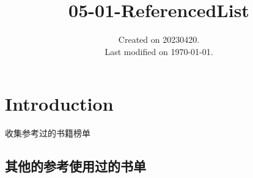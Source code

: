 \documentclass[UTF8]{../RepresentationUniverse}
\begin{document}
\title{05-01-ReferencedList}
\date{Created on 20230420.\\   Last modified on \today.}
\maketitle
\tableofcontents


\chapter{Introduction}

收集参考过的书籍榜单




\section{其他的参考使用过的书单}
\end{document}
